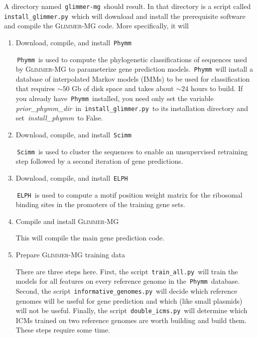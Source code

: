 \documentclass[fleqn,titlepage,11pt]{article}
\def\Desc#1{\,\mbox{\emph{#1}}\,}
\def\Gmg{\textsc{Glimmer-MG}}
\begin{document}
A directory named \,\verb`glimmer-mg`\, should result.
In that directory is a script called \,\verb`install_glimmer.py`\,
which will download and install the prerequisite software and
compile the \Gmg{} code. More specifically, it will
\begin{enumerate}\RaggedRight

\item Download, compile, and install \,\verb`Phymm`\,

  \,\verb`Phymm`\, is used to compute the phylogenetic classifications
  of sequences used by \Gmg{} to parameterize gene prediction models.
  \,\verb`Phymm`\, will install a database of interpolated Markov
  models (IMMs) to be used for classification that requires $\sim50$
  Gb of disk space and takes about $\sim24$ hours to build. If you
  already have \,\verb`Phymm`\, installed, you need only set the
  variable \Desc{prior\_phymm\_dir} in \,\verb`install_glimmer.py`\, to
  its installation directory and set \Desc{install\_phymm} to False.

\item Download, compile, and install \,\verb`Scimm`\,

  \,\verb`Scimm`\, is used to cluster the sequences to enable an
  unsupervised retraining step followed by a second iteration of
  gene predictions.

\item Download, compile, and install \,\verb`ELPH`\,

  \,\verb`ELPH`\, is used to compute a motif position weight matrix
  for the ribosomal binding sites in the promoters of the training
  gene sets.

\item Compile and install \Gmg{}

  This will compile the main gene prediction code.

\item Prepare \Gmg{} training data

  There are three steps here. First, the script
  \,\verb`train_all.py`\, will train the models for all features on
  every reference genome in the \,\verb`Phymm`\, database. Second, the
  script \,\verb`informative_genomes.py`\, will decide which reference
  genomes will be useful for gene prediction and which (like small
  plasmids) will not be useful. Finally, the script
  \,\verb`double_icms.py`\, will determine which ICMs trained on two
  reference genomes are worth building and build them. These steps
  require some time.

\end{enumerate}
\end{document}
